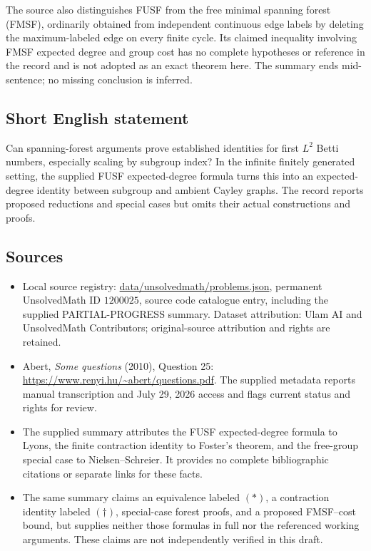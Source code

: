 \documentclass[11pt]{article}
\begin{document}
The source also distinguishes FUSF from the free minimal spanning forest (FMSF), ordinarily obtained from independent continuous edge labels by deleting the maximum-labeled edge on every finite cycle. Its claimed inequality involving FMSF expected degree and group cost has no complete hypotheses or reference in the record and is not adopted as an exact theorem here. The summary ends mid-sentence; no missing conclusion is inferred.
\subsection{Short English statement}
Can spanning-forest arguments prove established identities for first $L^2$ Betti numbers, especially scaling by subgroup index? In the infinite finitely generated setting, the supplied FUSF expected-degree formula turns this into an expected-degree identity between subgroup and ambient Cayley graphs. The record reports proposed reductions and special cases but omits their actual constructions and proofs.
\subsection{Sources}
\begin{itemize}
\item Local source registry: \url{data/unsolvedmath/problems.json}, permanent UnsolvedMath ID $1200025$, source code catalogue entry, including the supplied PARTIAL-PROGRESS summary. Dataset attribution: Ulam AI and UnsolvedMath Contributors; original-source attribution and rights are retained.
\item Abert, \emph{Some questions} (2010), Question 25: \url{https://www.renyi.hu/~abert/questions.pdf}. The supplied metadata reports manual transcription and July 29, 2026 access and flags current status and rights for review.
\item The supplied summary attributes the FUSF expected-degree formula to Lyons, the finite contraction identity to Foster's theorem, and the free-group special case to Nielsen--Schreier. It provides no complete bibliographic citations or separate links for these facts.
\item The same summary claims an equivalence labeled $(\ast)$, a contraction identity labeled $(\dagger)$, special-case forest proofs, and a proposed FMSF--cost bound, but supplies neither those formulas in full nor the referenced working arguments. These claims are not independently verified in this draft.
\end{itemize}
\end{document}
